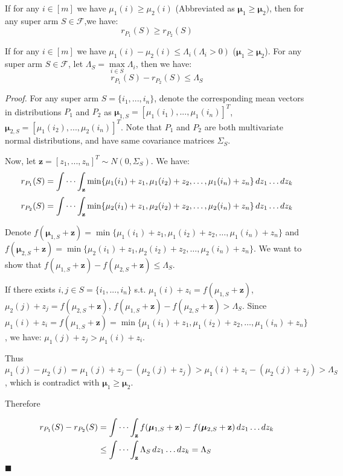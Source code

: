\documentclass[opre,sglanonrev]{informs4}
\begin{document}
\begin{lemma}
If for any $i \in [m]$ we have $\mu_1(i) \geq \mu_2(i)$ (Abbreviated as $\boldsymbol{\mu}_1 \geq \boldsymbol{\mu}_2)$, then for any super arm $S \in \mathcal{F}$,we have:
$$
r_{P_1}(S) \geq r_{P_2}(S)
$$	
\end{lemma}

\begin{lemma}
If for any $i \in [m]$ we have $\mu_1(i) - \mu_2(i) \leq \Lambda_i (\Lambda_i>0)$ ($\boldsymbol{\mu}_1 \geq \boldsymbol{\mu}_2$). For any super arm $S \in \mathcal{F}$, let $\Lambda_S = \mathop{\max}\limits_{i\in S}\Lambda_i$, then we have:
$$
r_{P_1}(S) - r_{P_2}(S) \leq \Lambda_S
$$
\end{lemma}
\textit{Proof.} For any super arm $S = \{i_1,...,i_n\}$, denote the corresponding mean vectors in distributions $P_1$ and $P_2$ as $\boldsymbol{\mu}_{1,S} = [\mu_1(i_1),...,\mu_1(i_n)]^T$, $\boldsymbol{\mu}_{2,S} = [\mu_1(i_2),...,\mu_2(i_n)]^T$. Note that $P_1$ and $P_2$ are both multivariate normal distributions, and have same covariance matrices $\Sigma_S$.

Now, let $\mathbf{z} = [z_1,...,z_n]^T \sim N(0,\Sigma_S)$. We have:
$$
r_{P_1}(S) = \idotsint_\mathbf{z} \min \{\mu_1(i_1)+z_1,\mu_1(i_2)+z_2, \dots ,\mu_1(i_n)+z_n\} \,dz_1 \dots dz_k
$$
$$
r_{P_2}(S) = \idotsint_\mathbf{z} \min \{\mu_2(i_1)+z_1,\mu_2(i_2)+z_2, \dots ,\mu_2(i_n)+z_n\} \,dz_1 \dots dz_k
$$

Denote $f(\boldsymbol{\mu}_{1,S}+\mathbf{z}) = \min \{\mu_1(i_1)+z_1,\mu_1(i_2)+z_2, \dots ,\mu_1(i_n)+z_n\}$ and $f(\boldsymbol{\mu}_{2,S}+\mathbf{z}) = \min \{\mu_2(i_1)+z_1,\mu_2(i_2)+z_2, \dots ,\mu_2(i_n)+z_n\}$. We want to show that $f(\mu_{1,S}+\mathbf{z})-f(\mu_{2,S}+\mathbf{z})\leq \Lambda_S$.

If there exists $i,j\in S=\{i_1,...,i_n\}$ s.t. $\mu_1(i)+z_i = f(\mu_{1,S}+\mathbf{z})$, $\mu_2(j)+z_j = f(\mu_{2,S}+\mathbf{z})$, $f(\mu_{1,S}+\mathbf{z})-f(\mu_{2,S}+\mathbf{z})>\Lambda_S$. Since $\mu_1(i)+z_i = f(\mu_{1,S}+\mathbf{z}) = \min \{\mu_1(i_1)+z_1,\mu_1(i_2)+z_2, \dots ,\mu_1(i_n)+z_n\}$, we have: $\mu_1(j)+z_j> \mu_1(i)+z_i$.

Thus $\mu_1(j)-\mu_2(j) = \mu_1(j)+z_j-(\mu_2(j)+z_j)>\mu_1(i)+z_i-(\mu_2(j)+z_j)>\Lambda_S$, which is contradict with $\boldsymbol{\mu}_1 \geq \boldsymbol{\mu}_2$.

Therefore

$$
\begin{aligned}
r_{P_1}(S)-r_{P_2}(S) &= \idotsint_\mathbf{z} f(\boldsymbol{\mu}_{1,S}+\mathbf{z})-f(\boldsymbol{\mu}_{2,S}+\mathbf{z}) \,dz_1 \dots dz_k\\
&\leq \idotsint_\mathbf{z} \Lambda_S \,dz_1 \dots dz_k = \Lambda_S 
\end{aligned}
$$
\hfill $\blacksquare$
\end{document}

